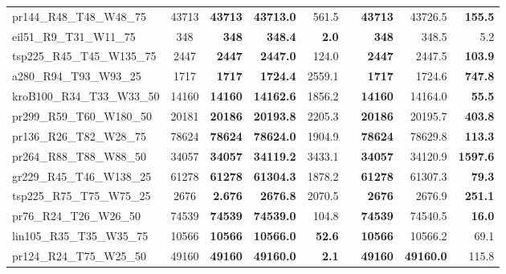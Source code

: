 \documentclass{singlecol-new}
\theoremstyle{TH}{
\newtheorem{lemma}{Lemma}
\newtheorem{theorem}[lemma]{Theorem}
\newtheorem{corrolary}[lemma]{Corrolary}
\newtheorem{conjecture}[lemma]{Conjecture}
\newtheorem{proposition}[lemma]{Proposition}
\newtheorem{claim}[lemma]{Claim}
\newtheorem{stheorem}[lemma]{Wrong Theorem}
}
\theoremstyle{THrm}{
\newtheorem{definition}{Definition}[section]
\newtheorem{question}{Question}[section]
\newtheorem{remark}{Remark}
\newtheorem{scheme}{Scheme}
}
\theoremstyle{THhit}{
\newtheorem{case}{Case}[section]
}
\begin{document}
\begin{table}[]
{\begin{tabular}{lcrrrrrrr}
		pr144\_R48\_T48\_W48\_75   & 43713                & \textbf{43713}  & \textbf{43713.0}  & 561.5           &  & \textbf{43713}  & 43726.5          & \textbf{155.5}  \\
		eil51\_R9\_T31\_W11\_75    & 348                  & \textbf{348}    & \textbf{348.4}    & \textbf{2.0}    &  & \textbf{348}    & 348.5            & 5.2             \\
		tsp225\_R45\_T45\_W135\_75 & 2447                 & \textbf{2447}   & \textbf{2447.0}   & 124.0           &  & \textbf{2447}   & 2447.5           & \textbf{103.9}  \\
		a280\_R94\_T93\_W93\_25    & 1717                 & \textbf{1717}   & \textbf{1724.4}   & 2559.1          &  & \textbf{1717}   & 1724.6           & \textbf{747.8}  \\
		kroB100\_R34\_T33\_W33\_50 & 14160                & \textbf{14160}  & \textbf{14162.6}  & 1856.2          &  & \textbf{14160}  & 14164.0          & \textbf{55.5}   \\
		pr299\_R59\_T60\_W180\_50  & 20181                & \textbf{20186}  & \textbf{20193.8}  & 2205.3          &  & \textbf{20186}  & 20195.7          & \textbf{403.8}  \\
		pr136\_R26\_T82\_W28\_75   & 78624                & \textbf{78624}  & \textbf{78624.0}  & 1904.9          &  & \textbf{78624}  & 78629.8          & \textbf{113.3}  \\
		pr264\_R88\_T88\_W88\_50   & 34057                & \textbf{34057}  & \textbf{34119.2}  & 3433.1          &  & \textbf{34057}  & 34120.9          & \textbf{1597.6} \\
		gr229\_R45\_T46\_W138\_25  & 61278                & \textbf{61278}  & \textbf{61304.3}  & 1878.2          &  & \textbf{61278}  & 61307.3          & \textbf{79.3}   \\
		tsp225\_R75\_T75\_W75\_25  & 2676                 & \textbf{2.676}  & \textbf{2676.8}   & 2070.5          &  & \textbf{2676}   & 2676.9           & \textbf{251.1}  \\
		pr76\_R24\_T26\_W26\_50    & 74539                & \textbf{74539}  & \textbf{74539.0}  & 104.8           &  & \textbf{74539}  & 74540.5          & \textbf{16.0}   \\
		lin105\_R35\_T35\_W35\_75  & 10566                & \textbf{10566}  & \textbf{10566.0}  & \textbf{52.6}   &  & \textbf{10566}  & 10566.2          & 69.1            \\
		pr124\_R24\_T75\_W25\_50   & 49160                & \textbf{49160}  & \textbf{49160.0}  & \textbf{2.1}    &  & \textbf{49160}  & \textbf{49160.0} & 115.8           \\

\end{tabular}}
\end{table}
\end{document}
